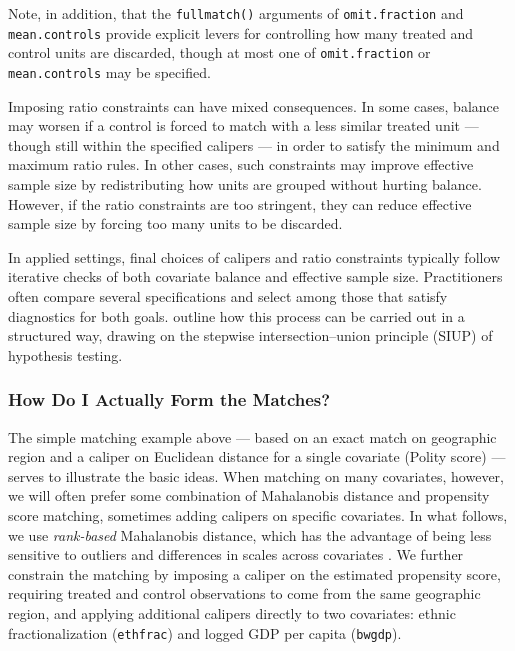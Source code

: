 \documentclass[
  12pt,
  leqno]{article}
\begin{document}
\doublespacing

Note, in addition, that the \texttt{fullmatch()} arguments of
\texttt{omit.fraction} and \texttt{mean.controls} provide explicit
levers for controlling how many treated and control units are discarded,
though at most one of \texttt{omit.fraction} or \texttt{mean.controls}
may be specified.

Imposing ratio constraints can have mixed consequences. In some cases,
balance may worsen if a control is forced to match with a less similar
treated unit --- though still within the specified calipers --- in order
to satisfy the minimum and maximum ratio rules. In other cases, such
constraints may improve effective sample size by redistributing how
units are grouped without hurting balance. However, if the ratio
constraints are too stringent, they can reduce effective sample size by
forcing too many units to be discarded.

In applied settings, final choices of calipers and ratio constraints
typically follow iterative checks of both covariate balance and
effective sample size. Practitioners often compare several
specifications and select among those that satisfy diagnostics for both
goals. \citet{hansensales2015} outline how this process can be carried
out in a structured way, drawing on the stepwise intersection--union
principle (SIUP) of hypothesis testing.

\subsubsection{How Do I Actually Form the
Matches?}\label{how-do-i-actually-form-the-matches}

The simple matching example above --- based on an exact match on
geographic region and a caliper on Euclidean distance for a single
covariate (Polity score) --- serves to illustrate the basic ideas. When
matching on many covariates, however, we will often prefer some
combination of Mahalanobis distance and propensity score matching,
sometimes adding calipers on specific covariates. In what follows, we
use \emph{rank-based} Mahalanobis distance, which has the advantage of
being less sensitive to outliers and differences in scales across
covariates \citep{rosenbaum2010}. We further constrain the matching by
imposing a caliper on the estimated propensity score, requiring treated
and control observations to come from the same geographic region, and
applying additional calipers directly to two covariates: ethnic
fractionalization (\texttt{ethfrac}) and logged GDP per capita
(\texttt{bwgdp}).
\end{document}
